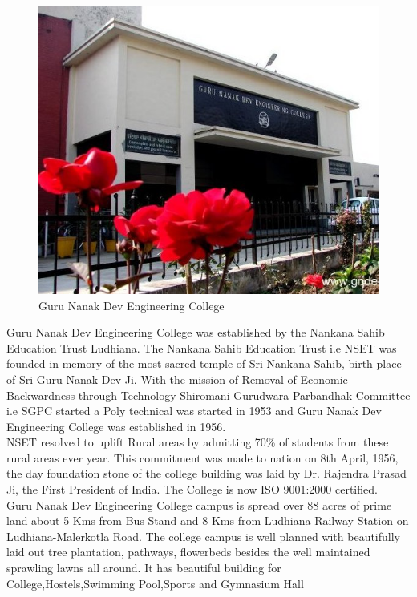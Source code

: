 
\begin{figure}[ht]
\centering
\includegraphics[scale=0.5]{input/images/gndec.jpg}
\caption{Guru Nanak Dev Engineering College}
\end{figure}
\hspace{-1.7em}
 Guru Nanak Dev Engineering College was established by the Nankana Sahib Education Trust Ludhiana. The Nankana Sahib Education Trust i.e NSET
was founded in memory of the most sacred temple of Sri Nankana Sahib, birth place
of Sri Guru Nanak Dev Ji. With the mission of Removal of Economic Backwardness
through Technology Shiromani Gurudwara Parbandhak Committee i.e SGPC started a
Poly technical was started in 1953 and Guru Nanak Dev Engineering College was established in 1956.\\
NSET resolved to uplift Rural areas by admitting 70\% 
of students from these rural
areas ever year. This commitment was made to nation on 8th April, 1956, the day
foundation stone of the college building was laid by Dr. Rajendra Prasad Ji, the First
President of India. The College is now ISO 9001:2000 certified.\\
Guru Nanak Dev Engineering College campus is spread over 88 acres of prime land
about 5 Kms from Bus Stand and 8 Kms from Ludhiana Railway Station on Ludhiana-Malerkotla Road. The college campus is well planned with beautifully laid out tree plantation, pathways, flowerbeds besides the well maintained sprawling lawns all around. It
has beautiful building for College,Hostels,Swimming Pool,Sports and Gymnasium Hall
